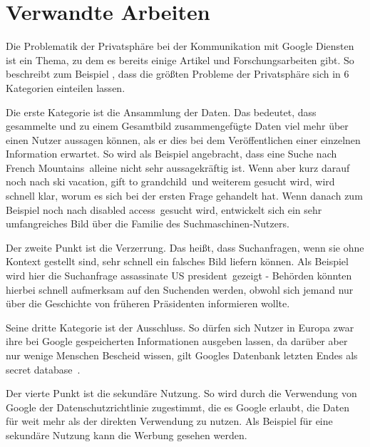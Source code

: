 % 
% 

\chapter{Verwandte Arbeiten}
Die Problematik der Privatsphäre bei der Kommunikation mit Google Diensten ist ein Thema, zu dem es bereits einige Artikel und Forschungsarbeiten gibt. So beschreibt zum Beispiel \citet{tene2007google}, dass die größten Probleme der Privatsphäre sich in 6 Kategorien einteilen lassen.

Die erste Kategorie ist die Ansammlung der Daten. Das bedeutet, dass gesammelte und zu einem Gesamtbild zusammengefügte Daten viel mehr über einen Nutzer aussagen können, als er dies bei dem Veröffentlichen einer einzelnen Information erwartet. So wird als Beispiel angebracht, dass eine Suche nach \glqq French Mountains\grqq\ alleine nicht sehr aussagekräftig ist. Wenn aber kurz darauf noch nach \glqq ski vacation\grqq , \glqq gift to grandchild\grqq\ und weiterem gesucht wird, wird schnell klar, worum es sich bei der ersten Frage gehandelt hat. Wenn danach zum Beispiel noch nach \glqq disabled access\grqq\ gesucht wird, entwickelt sich ein sehr umfangreiches Bild über die Familie des Suchmaschinen-Nutzers. 

Der zweite Punkt ist die Verzerrung. Das heißt, dass Suchanfragen, wenn sie ohne Kontext gestellt sind, sehr schnell ein falsches Bild liefern können. Als Beispiel wird hier die Suchanfrage \glqq assassinate US president\grqq\ gezeigt - Behörden könnten hierbei schnell aufmerksam auf den Suchenden werden, obwohl sich jemand nur über die Geschichte von früheren Präsidenten informieren wollte.

Seine dritte Kategorie ist der Ausschluss. So dürfen sich Nutzer in Europa zwar ihre bei Google gespeicherten Informationen ausgeben lassen, da darüber aber nur wenige Menschen Bescheid wissen, gilt Googles Datenbank letzten Endes als \glqq secret database\grqq\ . 

Der vierte Punkt ist die \glqq sekundäre Nutzung\grqq . So wird durch die Verwendung von Google der Datenschutzrichtlinie zugestimmt, die es Google erlaubt, die Daten für weit mehr als der direkten Verwendung zu nutzen. Als Beispiel für eine sekundäre Nutzung kann die Werbung gesehen werden. 

